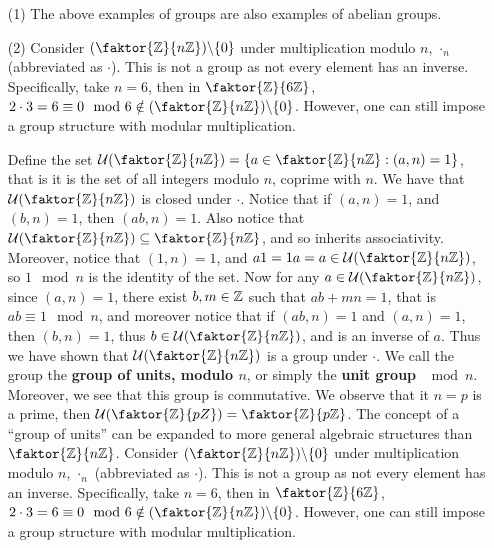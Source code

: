 \begin{example}\label{example_1.3}
  \begin{enumerate}
    \item[(1)] The above examples of groups are also examples of abelian groups.

    \item[(2)] Consider $\com{(\faktor{\Z}{n\Z})}{\{0\}}$ under multiplication
      modulo $n$, $\cdot_n$  (abbreviated as $\cdot$). This is not a group as
      not every element has an inverse. Specifically, take $n=6$, then in
      $\faktor{\Z}{6\Z}$, $2 \cdot 3=6 \equiv 0 \mod{6} \notin
      \com{(\faktor{\Z}{n\Z})}{\{0\}}$. However, one can still impose a group
      structure with modular multiplication.

      Define the set $\Uc{(\faktor{\Z}{n\Z})}=\{a \in \faktor{\Z}{n\Z} : (a,n)=1\}$,
      that is it is the set of all integers modulo $n$, coprime with $n$. We have
      that $\Uc{(\faktor{\Z}{n\Z})}$ is closed under $\cdot$. Notice that if
      $(a,n)=1$, and $(b,n)=1$, then $(ab,n)=1$. Also notice that
      $\Uc{(\faktor{\Z}{n\Z})} \subseteq \faktor{\Z}{n\Z}$, and so inherits
      associativity. Moreover, notice that $(1,n)=1$, and $a1=1a=a \in
      \Uc{(\faktor{\Z}{n\Z})}$, so $1 \mod{n}$ is the identity of the set. Now for
      any $a \in \Uc{(\faktor{\Z}{n\Z})}$, since $(a,n)=1$, there exist $b,m \in
      \mathbb{Z}$ such that $ab+mn=1$, that is $ab \equiv 1 \mod{n}$, and moreover notice
      that if $(ab,n)=1$ and $(a,n)=1$, then $(b,n)=1$, thus $b \in
      \Uc{(\faktor{\Z}{n\Z})}$, and is an inverse of $a$. Thus we have shown that
      $\Uc{(\faktor{\Z}{n\Z})}$ is a group under $\cdot$. We call the group the
      \textbf{group of units, modulo $n$}, or simply the \textbf{unit group $\mod{n}$}.
      Moreover, we see that this group is commutative. We observe that it
      $n=p$ is a prime, then  $\Uc{(\faktor{\Z}{pZ})}=\faktor{\Z}{p\Z}$. The concept
      of a ``group of units'' can be expanded to more general algebraic structures
      than $\faktor{\Z}{n\Z}$. Consider $\com{(\faktor{\Z}{n\Z})}{\{0\}}$ under multiplication
      modulo $n$, $\cdot_n$  (abbreviated as $\cdot$). This is not a group as
      not every element has an inverse. Specifically, take $n=6$, then in
      $\faktor{\Z}{6\Z}$, $2 \cdot 3=6 \equiv 0 \mod{6} \notin
      \com{(\faktor{\Z}{n\Z})}{\{0\}}$. However, one can still impose a group
      structure with modular multiplication.


\end{enumerate}
\end{example}
